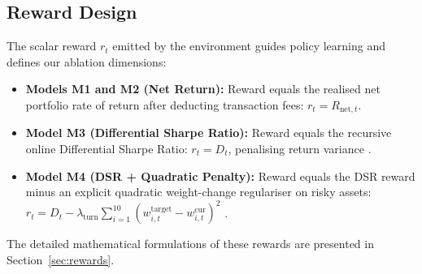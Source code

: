 \subsection{Reward Design}
The scalar reward $r_t$ emitted by the environment guides policy learning and defines our ablation dimensions:
\begin{itemize}
    \setlength{\itemsep}{1pt}
    \item \textbf{Models M1 and M2 (Net Return):} Reward equals the realised net portfolio rate of return after deducting transaction fees: $r_t = R_{\text{net},t}$.
    \item \textbf{Model M3 (Differential Sharpe Ratio):} Reward equals the recursive online Differential Sharpe Ratio: $r_t = D_t$, penalising return variance \citep{millea2021deep}.
    \item \textbf{Model M4 (DSR + Quadratic Penalty):} Reward equals the DSR reward minus an explicit quadratic weight-change regulariser on risky assets: $r_t = D_t - \lambda_{\text{turn}} \sum_{i=1}^{10} (w_{i,t}^{\text{target}} - w_{i,t}^{\text{cur}})^2$ \citep{wang2025risk}.
\end{itemize}
The detailed mathematical formulations of these rewards are presented in Section~\ref{sec:rewards}.
